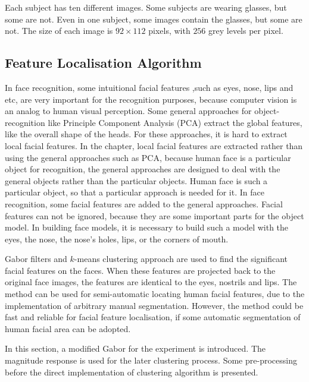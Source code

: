 Each subject has ten different images. Some subjects are wearing glasses, but some are not. Even in one subject, some images contain the glasses, but some are not. The size of each image is $92\times 112$ pixels, with $256$ grey levels per pixel. 

\subsection{Feature Localisation Algorithm}
In face recognition, some intuitional facial features ,such as eyes, nose, lips and etc, are very important for the recognition purposes, because computer vision is an analog to human visual perception. Some general approaches for object-recognition like Principle Component Analysis (PCA) \cite{Turk1991} extract the global features, like the overall shape of the heads. For these approaches, it is hard to extract local facial features. In the chapter, local facial features are extracted rather than using the general approaches such as PCA, because human face is a particular object for recognition, the general approaches are designed to deal with the general objects rather than the particular objects. Human face is such a particular object, so that a particular approach is needed for it. In face recognition, some facial features are added to the general approaches. Facial features can not be ignored, because they are some important parts for the object model. In building face models, it is necessary to build such a model with the eyes, the nose, the nose's holes, lips, or the corners of mouth. 

Gabor filters and $k$-means clustering approach are used to find the significant facial features on the faces. When these features are projected back to the original face images, the features are identical to the eyes, nostrils and lips. The method can be used for semi-automatic locating human facial features, due to the implementation of arbitrary manual segmentation. However, the method could be fast and reliable for facial feature localisation, if some automatic segmentation of human facial area can be adopted. 

In this section, a modified Gabor for the experiment is introduced. The magnitude response is used for the later clustering process. Some pre-processing  before the direct implementation of clustering algorithm is presented.


